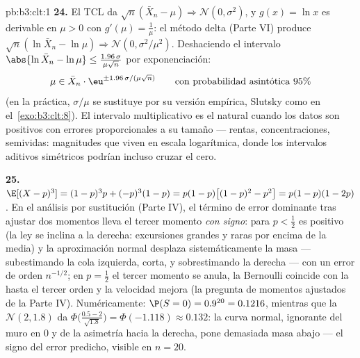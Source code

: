 \begin{solution}{pb:b3:clt:1}
\textbf{24.} El TCL da $\sqrt n(\bar X_n - \mu)
\Rightarrow \mathcal N(0, \sigma^2)$, y $g(x) = \ln x$ es derivable en
$\mu > 0$ con $g'(\mu) = \frac1\mu$: el método delta (Parte VI) produce
$\sqrt n(\ln\bar X_n - \ln\mu)
\Rightarrow \mathcal N(0, \sigma^2/\mu^2)$. Deshaciendo el intervalo
$\abs{\ln\bar X_n - \ln\mu} \leq
\frac{1.96\,\sigma}{\mu\sqrt n}$ por exponenciación:
\[
\mu \in \bar X_n\cdot
\eu^{\pm1.96\,\sigma/(\mu\sqrt n)}
\qquad\text{con probabilidad asintótica } 95\%
\]
(en la práctica, $\sigma/\mu$ se sustituye por su versión empírica,
Slutsky como en el~\cref{exo:b3:clt:8}). El intervalo multiplicativo es
el natural cuando los datos son positivos con errores proporcionales a
su tamaño --- rentas, concentraciones, semividas: magnitudes que viven
en escala logarítmica, donde los intervalos aditivos simétricos podrían
incluso cruzar el cero.

\textbf{25.} $\E[(X - p)^3] = (1-p)^3p + (-p)^3(1 - p) =
p(1-p)\bigl[(1-p)^2 - p^2\bigr] = p(1-p)(1 - 2p)$. En el análisis por
sustitución (Parte IV), el término de error dominante tras ajustar dos
momentos lleva el tercer momento \emph{con signo}: para $p < \frac12$ es
positivo (la ley se inclina a la derecha: excursiones grandes y raras
por encima de la media) y la aproximación normal desplaza
sistemáticamente la masa --- subestimando la cola izquierda, corta, y
sobrestimando la derecha --- con un error de orden $n^{-1/2}$; en $p =
\frac12$ el tercer momento se anula, la Bernoulli coincide con la
 hasta el tercer orden y la
velocidad mejora (la pregunta de momentos ajustados de la Parte IV).
Numéricamente: $\P(S = 0) =
0.9^{20} = 0.1216$, mientras que la
 $\mathcal N(2, 1.8)$ da
$\Phi\bigl(\frac{0.5 -
2}{\sqrt{1.8}}\bigr) = \Phi(-1.118) \approx 0.132$: la curva normal,
ignorante del muro en $0$ y de la asimetría hacia la derecha, pone
demasiada masa abajo --- el signo del error predicho, visible en
$n = 20$.
\end{solution}
